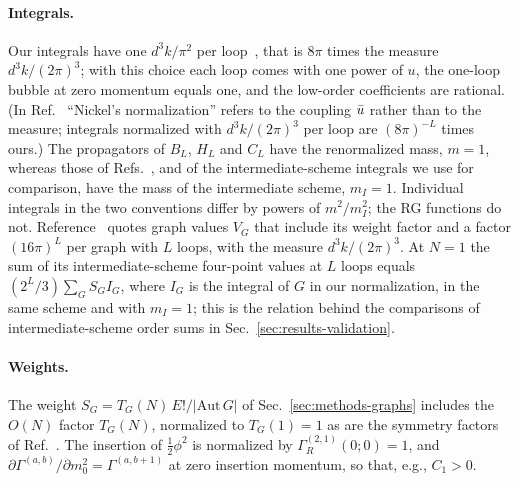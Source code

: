 \paragraph{Integrals.}
Our integrals have one $d^3k/\pi^2$ per loop~\cite{NMB1977}, that is $8\pi$ times the measure $d^3k/(2\pi)^3$; with
this choice each loop comes with one power of $u$, the one-loop bubble at zero momentum equals one, and the low-order
coefficients are rational. (In Ref.~\cite{Ribeca2003thesis} ``Nickel's normalization'' refers to the coupling
$\bar u$ rather than to the measure; integrals normalized with $d^3k/(2\pi)^3$ per loop are $(8\pi)^{-L}$ times ours.)
The propagators of $B_L$, $H_L$ and $C_L$ have the renormalized mass, $m=1$, whereas those of
Refs.~\cite{NMB1977,Ribeca2003thesis,Phi4tools2024}, and of the intermediate-scheme integrals we use for comparison,
have the mass of the intermediate scheme, $m_I=1$. Individual integrals in the two conventions differ by powers of
$m^2/m_I^2$; the RG functions do not. Reference~\cite{Phi4tools2024} quotes graph values $V_G$ that include its weight
factor and a factor $(16\pi)^{L}$ per graph with $L$ loops, with the measure $d^3k/(2\pi)^3$. At $N=1$ the sum of
its intermediate-scheme four-point values at $L$ loops equals $(2^{L}/3)\sum_G S_G I_G$, where $I_G$ is the integral of
$G$ in our normalization, in the same scheme and with $m_I=1$; this is the relation behind the comparisons of
intermediate-scheme order sums in Sec.~\ref{sec:results-validation}.

\paragraph{Weights.}
The weight $S_G=T_G(N)\,E!/|\mathrm{Aut}\,G|$ of Sec.~\ref{sec:methods-graphs} includes the $O(N)$ factor $T_G(N)$,
normalized to $T_G(1)=1$ as are the symmetry factors of Ref.~\cite{Phi4tools2024}. The insertion of $\tfrac12\phi^2$ is
normalized by $\Gamma^{(2,1)}_R(0;0)=1$, and $\partial\Gamma^{(a,b)}/\partial m_0^2=\Gamma^{(a,b+1)}$ at zero insertion
momentum, so that, e.g., $C_1>0$.


